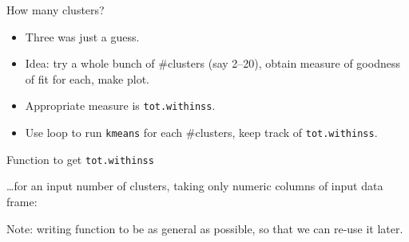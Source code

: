 \documentclass[ignorenonframetext,]{beamer}
\newenvironment{Shaded}{\begin{snugshade}}{\end{snugshade}}
\newcommand{\ControlFlowTok}[1]{\textcolor[rgb]{0.13,0.29,0.53}{\textbf{#1}}}
\newcommand{\DataTypeTok}[1]{\textcolor[rgb]{0.13,0.29,0.53}{#1}}
\newcommand{\DecValTok}[1]{\textcolor[rgb]{0.00,0.00,0.81}{#1}}
\newcommand{\KeywordTok}[1]{\textcolor[rgb]{0.13,0.29,0.53}{\textbf{#1}}}
\newcommand{\NormalTok}[1]{#1}
\newcommand{\OperatorTok}[1]{\textcolor[rgb]{0.81,0.36,0.00}{\textbf{#1}}}
\newcommand{\StringTok}[1]{\textcolor[rgb]{0.31,0.60,0.02}{#1}}
\begin{document}
\begin{frame}[fragile]{How many clusters?}
\protect\hypertarget{how-many-clusters}{}

\begin{itemize}
\item
  Three was just a guess.
\item
  Idea: try a whole bunch of \#clusters (say 2--20), obtain measure of
  goodness of fit for each, make plot.
\item
  Appropriate measure is \texttt{tot.withinss}.
\item
  Use loop to run \texttt{kmeans} for each \#clusters, keep track of
  \texttt{tot.withinss}.
\end{itemize}

\end{frame}

\begin{frame}[fragile]{Function to get \texttt{tot.withinss}}
\protect\hypertarget{function-to-get-tot.withinss}{}

\ldots for an input number of clusters, taking only numeric columns of
input data frame:

\begin{Shaded}
\end{Shaded}

Note: writing function to be as general as possible, so that we can
re-use it later.

\end{frame}
\end{document}
